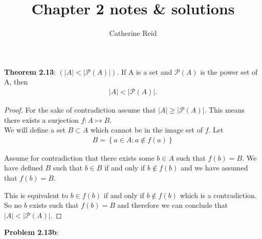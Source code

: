 \documentclass{article}
\author{Catherine Reid}
\title{Chapter 2 notes \& solutions}
\date{}
\begin{document}
\maketitle

\textbf{Theorem 2.13}: $(|A| < | \mathcal{P}(A)|)$. If A is a set and $\mathcal{P}(A)$ is the power set of A, then
\begin{align*}
	|A| < | \mathcal{P}(A)|.
\end{align*}

\begin{proof}
	For the sake of contradiction assume that $|A| \geq | \mathcal{P}(A)|$. This means there exists a surjection $f: A \mapsto B$.\\

	We will define a set $B \subset A$ which cannot be in the image set of $f$. Let
	\begin{align*}
		B = \left\{a \in A: a \notin f(a) \right\}
	\end{align*}

	Assume for contradiction that there exists some $b \in A$ such that $f(b) = B$. We have defined $B$ such that $b \in B$ if and only if $b \notin f(b)$ and we have assumed that $f(b) = B$.

	This is equivalent to $b \in f(b)$ if and only if $b \notin f(b)$ which is a contradiction.
	So no $b$ exists such that $f(b) = B$ and therefore we can conclude that $|A| < | \mathcal{P}(A)|$.

\end{proof}

\textbf{Problem 2.13b}:
\end{document}
